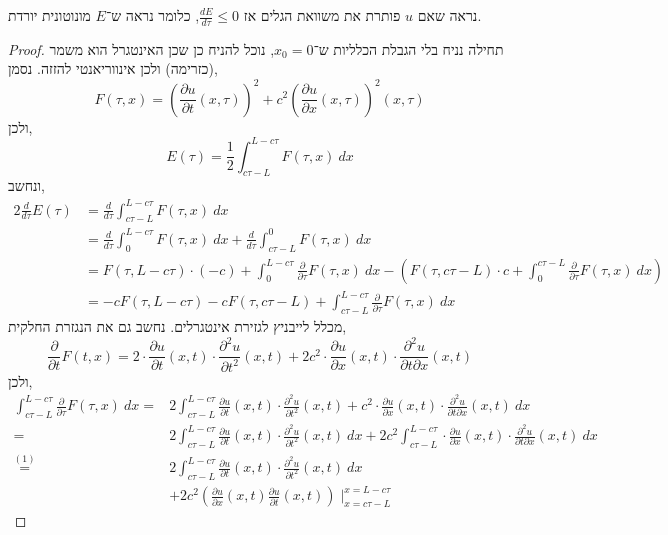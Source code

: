 \subquestion{}
נראה שאם $u$ פותרת את משוואת הגלים אז $\frac{d E}{d \tau} \le 0$, כלומר נראה ש־$E$ מונוטונית יורדת.
\begin{proof}
	תחילה נניח בלי הגבלת הכלליות ש־$x_0 = 0$, נוכל להניח כן שכן האינטגרל הוא משמר (כזרימה) ולכן אינווריאנטי להזזה.
	נסמן,
	\[
		F(\tau, x)
		= {\left(\frac{\partial u}{\partial t}(x, \tau)\right)}^2 + c^2 {\left(\frac{\partial u}{\partial x}(x, \tau)\right)}^2 (x, \tau)
	\]
	ולכן,
	\[
		E(\tau)
		= \frac{1}{2} \int_{c \tau - L}^{L - c \tau} F(\tau, x)\ dx
	\]
	ונחשב,
	\begin{align*}
		2 \frac{d}{d \tau} E(\tau)
		& = \frac{d}{d \tau} \int_{c \tau - L}^{L - c \tau} F(\tau, x)\ dx \\
		& = \frac{d}{d \tau} \int_0^{L - c \tau} F(\tau, x)\ dx + \frac{d}{d \tau} \int_{c \tau - L}^0 F(\tau, x)\ dx \\
		& = F(\tau, L - c \tau) \cdot (-c) + \int_{0}^{L - c \tau} \frac{\partial}{\partial \tau} F(\tau, x)\ dx
		- \left(F(\tau, c \tau - L) \cdot c + \int_{0}^{c \tau - L} \frac{\partial}{\partial \tau} F(\tau, x)\ dx\right) \\
		& = - c F(\tau, L - c \tau) - c F(\tau, c \tau - L) + \int_{c \tau - L}^{L - c \tau} \frac{\partial}{\partial \tau} F(\tau, x)\ dx
	\end{align*}
	מכלל לייבניץ לגזירת אינטגרלים.
	נחשב גם את הנגזרת החלקית,
	\[
		\frac{\partial}{\partial t} F(t, x)
		= 2 \cdot \frac{\partial u}{\partial t}(x, t) \cdot \frac{\partial^2 u}{\partial t^2}(x, t) + 2 c^2 \cdot \frac{\partial u}{\partial x}(x, t) \cdot \frac{\partial^2 u}{\partial t \partial x}(x, t)
	\]
	ולכן,
	\begin{align*}
		\int_{c \tau - L}^{L - c \tau} \frac{\partial}{\partial \tau} F(\tau, x)\ dx
		= & 2 \int_{c \tau - L}^{L - c \tau} \frac{\partial u}{\partial t}(x, t) \cdot \frac{\partial^2 u}{\partial t^2}(x, t)
		+ c^2 \cdot \frac{\partial u}{\partial x}(x, t) \cdot \frac{\partial^2 u}{\partial t \partial x}(x, t)\ dx \\
		= & 2 \int_{c \tau - L}^{L - c \tau} \frac{\partial u}{\partial t}(x, t) \cdot \frac{\partial^2 u}{\partial t^2}(x, t)\ dx
		+ 2 c^2 \int_{c \tau - L}^{L - c \tau} \cdot \frac{\partial u}{\partial x}(x, t) \cdot \frac{\partial^2 u}{\partial t \partial x}(x, t)\ dx \\
		\overset{(1)}{=}  & 2 \int_{c \tau - L}^{L - c \tau} \frac{\partial u}{\partial t}(x, t) \cdot \frac{\partial^2 u}{\partial t^2}(x, t)\ dx \\
		& + 2 c^2 (\frac{\partial u}{\partial x}(x, t) \frac{\partial u}{\partial t}(x, t)) \mid_{x = c \tau - L}^{x = L - c \tau}

\end{align*}
\end{proof}
